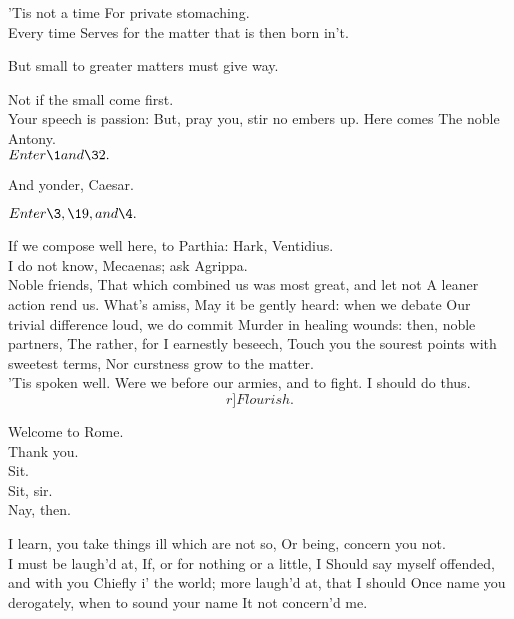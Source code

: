 \documentclass{book}
\begin{document}
	'Tis not a time
	For private stomaching.        \\

	Every time
	Serves for the matter that is then born in't.

	But small to greater matters must give way.

	Not if the small come first.  \\

	Your speech is passion:
	But, pray you, stir no embers up. Here comes
	The noble Antony. \\

	\(Enter \1 and \32.\)

	                  And yonder, Caesar.

	\(Enter \3, \19, and \4.\)

\1	If we compose well here, to Parthia:
	Hark, Ventidius. \\

\3	                  I do not know,
	Mecaenas; ask Agrippa. \\

	Noble friends,
	That which combined us was most great, and let not
	A leaner action rend us. What's amiss,
	May it be gently heard: when we debate
	Our trivial difference loud, we do commit
	Murder in healing wounds: then, noble partners,
	The rather, for I earnestly beseech,
	Touch you the sourest points with sweetest terms,
	Nor curstness grow to the matter. \\

\1	'Tis spoken well.
	Were we before our armies, and to fight.
	I should do thus. \[r]Flourish.\]

\3	Welcome to Rome. \\

\1	                  Thank you.  \\

\3	Sit. \\

\1	Sit, sir. \\

\3	Nay, then.

\1	I learn, you take things ill which are not so,
	Or being, concern you not.\\

\3	I must be laugh'd at,
	If, or for nothing or a little, I
	Should say myself offended, and with you
	Chiefly i' the world; more laugh'd at, that I should
	Once name you derogately, when to sound your name
	It not concern'd me. \\
\end{document}

